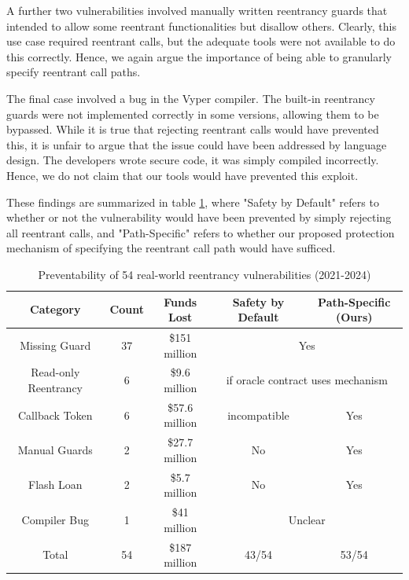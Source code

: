 \par
A further two vulnerabilities involved manually written reentrancy guards that intended to allow some reentrant functionalities but disallow others. Clearly, this use case required reentrant calls, but the adequate tools were not available to do this correctly. Hence, we again argue the importance of being able to granularly specify reentrant call paths.
\par
The final case involved a bug in the Vyper compiler. The built-in reentrancy guards were not implemented correctly in some versions, allowing them to be bypassed. While it is true that rejecting reentrant calls would have prevented this, it is unfair to argue that the issue could have been addressed by language design. The developers wrote secure code, it was simply compiled incorrectly. Hence, we do not claim that our tools would have prevented this exploit.
\par
These findings are summarized in table \ref{table:reentrancyresults}, where "Safety by Default" refers to whether or not the vulnerability would have been prevented by simply rejecting all reentrant calls, and "Path-Specific" refers to whether our proposed protection mechanism of specifying the reentrant call path would have sufficed.

\begin{table}[h!]
\centering
{\setlength{\extrarowheight}{5pt}
\begin{tabular}{  c  c  c  c  c  }
 \toprule
 Category                       & Count & Funds Lost & Safety by Default & Path-Specific (Ours) \\ [4pt]
 \midrule
 Missing Guard              & 37       & \$151 million & \multicolumn{2}{c}{\cellcolor{green!25}Yes} \\ [3pt]
 Read-only Reentrancy & 6         &  \$9.6 million & \multicolumn{2}{c}{\cellcolor{green!25}if oracle contract uses mechanism} \\[3pt]
 Callback Token             & 6         &  \$57.6 million & \cellcolor{yellow!25}incompatible & \cellcolor{green!25}Yes \\[3pt]
 Manual Guards             & 2         &  \$27.7 million & \cellcolor{red!25}No & \cellcolor{green!25}Yes \\[3pt]
 Flash Loan                     & 2         &  \$5.7 million & \cellcolor{red!25}No & \cellcolor{green!25}Yes \\[3pt]
 Compiler Bug               & 1         &  \$41 million & \multicolumn{2}{c}{\cellcolor{yellow!25}Unclear} \\[3pt]
 \midrule
 Total                               & 54        &  \$187 million & 43/54 & 53/54 \\[3pt]
 \bottomrule
\end{tabular}
}
\caption{Preventability of 54 real-world reentrancy vulnerabilities (2021-2024)}
\label{table:reentrancyresults}
\end{table}

